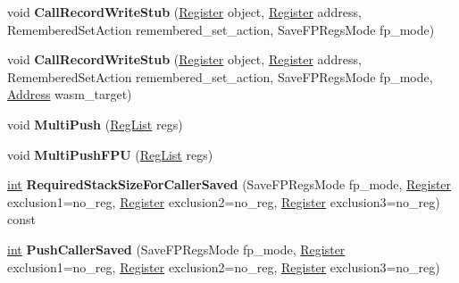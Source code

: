 \begin{DoxyCompactItemize}
void {\bfseries Call\+Record\+Write\+Stub} (\mbox{\hyperlink{classv8_1_1internal_1_1Register}{Register}} object, \mbox{\hyperlink{classv8_1_1internal_1_1Register}{Register}} address, Remembered\+Set\+Action remembered\+\_\+set\+\_\+action, Save\+F\+P\+Regs\+Mode fp\+\_\+mode)
\item 
\mbox{\label{classv8_1_1internal_1_1TurboAssembler_a2bc1271b1999cb2ee3784489515931b6}} 
void {\bfseries Call\+Record\+Write\+Stub} (\mbox{\hyperlink{classv8_1_1internal_1_1Register}{Register}} object, \mbox{\hyperlink{classv8_1_1internal_1_1Register}{Register}} address, Remembered\+Set\+Action remembered\+\_\+set\+\_\+action, Save\+F\+P\+Regs\+Mode fp\+\_\+mode, \mbox{\hyperlink{classuintptr__t}{Address}} wasm\+\_\+target)
\item 
\mbox{\label{classv8_1_1internal_1_1TurboAssembler_aa307d4d701ec326de7bba1dddb94582a}} 
void {\bfseries Multi\+Push} (\mbox{\hyperlink{classuint32__t}{Reg\+List}} regs)
\item 
\mbox{\label{classv8_1_1internal_1_1TurboAssembler_ae3411f3b22363007c2f7aa94528c8371}} 
void {\bfseries Multi\+Push\+F\+PU} (\mbox{\hyperlink{classuint32__t}{Reg\+List}} regs)
\item 
\mbox{\label{classv8_1_1internal_1_1TurboAssembler_ade281f6d328e2fdd51963e91bda13365}} 
\mbox{\hyperlink{classint}{int}} {\bfseries Required\+Stack\+Size\+For\+Caller\+Saved} (Save\+F\+P\+Regs\+Mode fp\+\_\+mode, \mbox{\hyperlink{classv8_1_1internal_1_1Register}{Register}} exclusion1=no\+\_\+reg, \mbox{\hyperlink{classv8_1_1internal_1_1Register}{Register}} exclusion2=no\+\_\+reg, \mbox{\hyperlink{classv8_1_1internal_1_1Register}{Register}} exclusion3=no\+\_\+reg) const
\item 
\mbox{\label{classv8_1_1internal_1_1TurboAssembler_a05799e0b139129becdabdf8af8e18810}} 
\mbox{\hyperlink{classint}{int}} {\bfseries Push\+Caller\+Saved} (Save\+F\+P\+Regs\+Mode fp\+\_\+mode, \mbox{\hyperlink{classv8_1_1internal_1_1Register}{Register}} exclusion1=no\+\_\+reg, \mbox{\hyperlink{classv8_1_1internal_1_1Register}{Register}} exclusion2=no\+\_\+reg, \mbox{\hyperlink{classv8_1_1internal_1_1Register}{Register}} exclusion3=no\+\_\+reg)

\end{DoxyCompactItemize}
